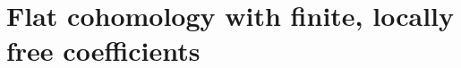 \documentclass[11pt, reqno]{amsart}
\newcommand{\bM}{\mathbb{M}}
\providecommand{\f}[2]{\frac{#1}{#2}}
\providecommand{\ucolon}{{\upshape:} }
\providecommand{\qxq}[1]{\quad\text{#1}\quad}
\newcommand{\tst}{\textstyle}
\newcommand{\bpf}{\begin{proof}}
\newcommand{\epf}{\end{proof}}
\newcommand{\bprop}{\begin{prop}}
\newcommand{\eprop}{\end{prop}}
\newcommand{\bcor}{\begin{cor}}
\newcommand{\ecor}{\end{cor}}
\numberwithin{equation}{numberingbase}
\theoremstyle{thms}
\newtheorem{cor}[numberingbase]{Corollary}
\newtheorem{prop}[numberingbase]{Proposition}
\theoremstyle{claims}
\theoremstyle{defs}
\theoremstyle{thms}
\theoremstyle{defs}
\theoremstyle{subsection-tweak}
\theoremstyle{subsection-tweak}
\begin{document}






























\section{Flat cohomology with finite, locally free coefficients} \label{reduction}
\end{document}
